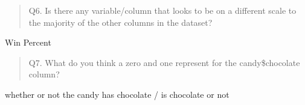 \documentclass[
  letterpaper,
  DIV=11,
  numbers=noendperiod]{scrartcl}
\newenvironment{Shaded}{\begin{snugshade}}{\end{snugshade}}
\newcommand{\FunctionTok}[1]{\textcolor[rgb]{0.28,0.35,0.67}{#1}}
\newcommand{\NormalTok}[1]{\textcolor[rgb]{0.00,0.23,0.31}{#1}}
\newcommand{\OtherTok}[1]{\textcolor[rgb]{0.00,0.23,0.31}{#1}}
\newcommand{\SpecialCharTok}[1]{\textcolor[rgb]{0.37,0.37,0.37}{#1}}
\begin{document}
\begin{quote}
Q6. Is there any variable/column that looks to be on a different scale
to the majority of the other columns in the dataset?
\end{quote}

Win Percent

\begin{quote}
Q7. What do you think a zero and one represent for the candy\$chocolate
column?
\end{quote}

whether or not the candy has chocolate / is chocolate or not

\begin{Shaded}
\end{Shaded}
\end{document}
